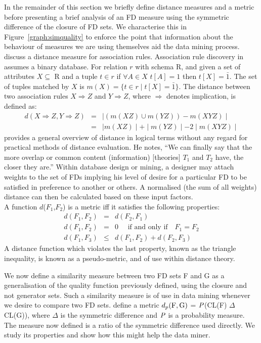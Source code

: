 In the remainder of this section we
briefly define distance measures and a metric before presenting a brief
analysis of an FD measure using the symmetric difference of the
closure of FD sets. We characterise this in Figure~\ref{graph:simquality}
to enforce the point that information about the behaviour of measures
we are using themselves aid the data mining process.
\cite{tkr95} discuss a distance measure for association rules. 
Association rule discovery in \cite{ais93} assumes a binary database.
For relation $r$ with schema R, and given a set of attributes
 $X \subseteq$ R and a tuple $t \in r$ if $\forall A \in X$ $t[A] = 1$  
then $t[X] = \bar{1}$.  The set of tuples matched by $X$ is
$m(X) = \{ t \in r \mid t[X] = \bar{1} \}$.  The distance between
two association rules $X \Rightarrow Z$ and $Y \Rightarrow Z$, where
$\Rightarrow$ denotes implication, is
defined as:
{\line
\begin{eqnarray*}
d(X \Rightarrow Z, Y \Rightarrow Z) & = & \mid (m(XZ) \cup m(YZ)) - m(XYZ) \mid \\
 				    & = & \mid m(XZ) \mid + \mid m(YZ) \mid - 2 \mid m(XYZ) \mid
\end{eqnarray*}
}
\cite{tuo78} provides a general overview of distance in logical
terms without any regard for practical methods of distance 
evaluation. He notes, ``We can finally say that the more
overlap or common content  (information) [theories] $T_1$ and $T_2$
have, the closer they are.'' Within database design or mining, a
designer may attach weights to the set of FDs implying his
level of desire for a particular FD to be satisfied in
preference to another or others. A normalised (the sum of
all weights) distance can then be calculated based on these
input factors. \\

A function $d$($F_1$,$F_2$) is a metric iff it satisfies the
following properties:
{\line
\begin{eqnarray*}
d(F_1,F_2) & = & d(F_2, F_1)  \\
d(F_1,F_2)   & = & 0 \quad\mbox{ if and only if}\quad F_1 = F_2  \\
d(F_1,F_3)   & \le & d(F_1,F_2) + d(F_2,F_3) 
\end{eqnarray*}
}
A distance function which violates the last property, known as the
triangle inequality, is known as a pseudo-metric, and of use within
distance theory. 

We now define a similarity measure between two FD sets F and G as
a generalisation of the quality function previously defined, using the
closure and not generator sets. Such a
similarity measure is of use in data mining whenever we desire to
compare two FD sets. \cite{km95} define a metric $d_p({\rm F},{\rm G})$ = ${\it
P}$(CL(F) $\Delta$ CL(G)), where $\Delta$ is the symmetric difference and
${\it P}$ is a probability measure. The measure now defined is a
ratio of the symmetric difference used directly. We study its
properties and show how this might help the data miner.

